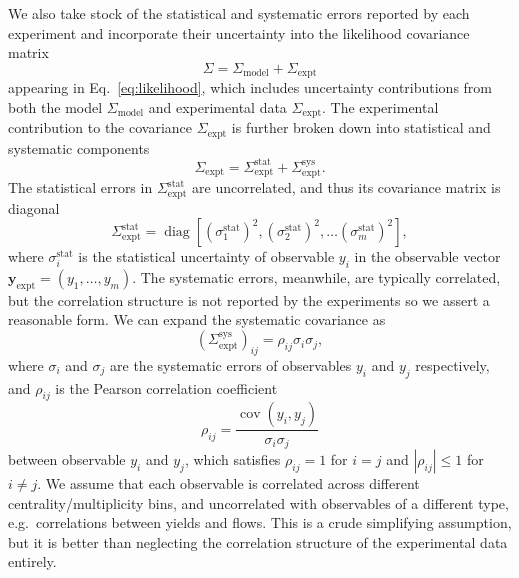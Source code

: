\documentclass[aps,prc,reprint,amsmath,nofootinbib]{revtex4-1}
\newcommand{\ye}{{\mathbf y}_\text{expt}}
\newcommand{\Sigmam}{\Sigma_\text{model}}
\newcommand{\Sigmae}{\Sigma_\text{expt}}
\DeclareMathOperator{\diag}{diag}
\DeclareMathOperator{\cov}{cov}
\begin{document}
We also take stock of the statistical and systematic errors reported by each experiment and incorporate their uncertainty into the likelihood covariance matrix
\begin{equation}
  \Sigma = \Sigmam + \Sigmae
\end{equation}
appearing in Eq.~\eqref{eq:likelihood}, which includes uncertainty contributions from both the model $\Sigmam$ and experimental data $\Sigmae$.
The experimental contribution to the covariance $\Sigmae$ is further broken down into statistical and systematic components
\begin{equation}
  \Sigmae = \Sigmae^\text{stat} + \Sigmae^\text{sys}.
\end{equation}
The statistical errors in $\Sigmae^\text{stat}$ are uncorrelated, and thus its covariance matrix is diagonal
\begin{equation}
  \Sigmae^\text{stat} = \diag[(\sigma^\text{stat}_1)^2, (\sigma^\text{stat}_2)^2, \dots (\sigma^\text{stat}_m)^2 ],
\end{equation}
where $\sigma^\text{stat}_i$ is the statistical uncertainty of observable $y_i$ in the observable vector $\ye = (y_1, \dots, y_m)$.
The systematic errors, meanwhile, are typically correlated, but the correlation structure is not reported by the experiments so we assert a reasonable form.
We can expand the systematic covariance as
\begin{equation}
  (\Sigmae^\text{sys})_{ij} =  \rho_{ij} \sigma_i \sigma_j,
\end{equation}
where $\sigma_i$ and $\sigma_j$ are the systematic errors of observables $y_i$ and $y_j$ respectively, and $\rho_{ij}$ is the Pearson correlation coefficient
\begin{equation}
  \rho_{ij} = \frac{\cov(y_i, y_j)}{\sigma_i \sigma_j}
\end{equation}
between observable $y_i$ and $y_j$, which satisfies $\rho_{ij}=1$ for $i=j$ and $|\rho_{ij}| \le 1$ for $i \ne j$.
We assume that each observable is correlated across different centrality/multiplicity bins, and uncorrelated with observables of a different type, e.g.\ correlations between yields and flows.
This is a crude simplifying assumption, but it is better than neglecting the correlation structure of the experimental data entirely.
\end{document}
